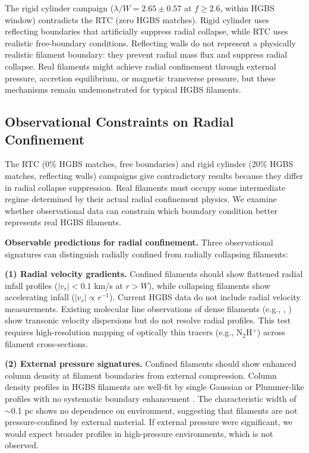 \documentclass[twocolumn,longtitle,usenatbib]{mnras}
\begin{document}
The rigid cylinder campaign ($\lambda/W = 2.65 \pm 0.57$ at $f \geq 2.6$, within HGBS window) contradicts the RTC (zero HGBS matches). Rigid cylinder uses reflecting boundaries that artificially suppress radial collapse, while RTC uses realistic free-boundary conditions. Reflecting walls do not represent a physically realistic filament boundary: they prevent radial mass flux and suppress radial collapse. Real filaments might achieve radial confinement through external pressure, accretion equilibrium, or magnetic transverse pressure, but these mechanisms remain undemonstrated for typical HGBS filaments.

\subsection{Observational Constraints on Radial Confinement}
\label{sec:radial_confinement}

The RTC (0\% HGBS matches, free boundaries) and rigid cylinder (20\% HGBS matches, reflecting walls) campaigns give contradictory results because they differ in radial collapse suppression. Real filaments must occupy some intermediate regime determined by their actual radial confinement physics. We examine whether observational data can constrain which boundary condition better represents real HGBS filaments.

\textbf{Observable predictions for radial confinement.}
Three observational signatures can distinguish radially confined from radially collapsing filaments:

\textbf{(1) Radial velocity gradients.}
Confined filaments should show flattened radial infall profiles ($|v_r| < 0.1$ km/s at $r > W$), while collapsing filaments show accelerating infall ($|v_r| \propto r^{-1}$). Current HGBS data do not include radial velocity measurements. Existing molecular line observations of dense filaments (e.g., \citet{Hacar2013}, \citet{Arzoumanian2011}) show transonic velocity dispersions but do not resolve radial profiles. This test requires high-resolution mapping of optically thin tracers (e.g., N$_2$H$^+$) across filament cross-sections.

\textbf{(2) External pressure signatures.}
Confined filaments should show enhanced column density at filament boundaries from external compression. Column density profiles in HGBS filaments are well-fit by single Gaussian or Plummer-like profiles with no systematic boundary enhancement \citep{Arzoumanian2011}. The characteristic width of $\sim$0.1 pc shows no dependence on environment, suggesting that filaments are not pressure-confined by external material. If external pressure were significant, we would expect broader profiles in high-pressure environments, which is not observed.
\end{document}
